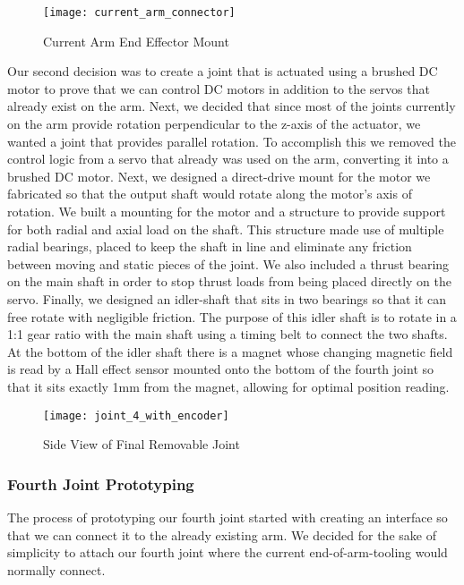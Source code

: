 \begin{figure}[H]
	\centering
	\texttt{[image: current\_arm\_connector]}
	\caption{Current Arm End Effector Mount}
	\label{Current Arm Encoder Mount}
\end{figure}



\noindent Our second decision was to create a joint that is actuated using a brushed DC motor to prove that we can control DC motors in addition to the servos that already exist on the arm.  Next, we decided that since most of the joints currently on the arm provide rotation perpendicular to the z-axis of the actuator, we wanted a joint that provides parallel rotation. To accomplish this we removed the control logic from a servo that already was used on the arm, converting it into a brushed DC motor. Next, we designed a direct-drive mount for the motor we fabricated so that the output shaft would rotate along the motor's axis of rotation.  We built a mounting for the motor and a structure to provide support for both radial and axial load on the shaft. This structure made use of multiple radial bearings, placed to keep the shaft in line and eliminate any friction between moving and static pieces of the joint.  We also included a thrust bearing on the main shaft in order to stop thrust loads from being placed directly on the servo.  Finally, we designed an idler-shaft that sits in two bearings so that it can free rotate with negligible friction. The purpose of this idler shaft is to rotate in a 1:1 gear ratio with the main shaft using a timing belt to connect the two shafts.  At the bottom of the idler shaft there is a magnet whose changing magnetic field is read by a Hall effect sensor mounted onto the bottom of the fourth joint so that it sits exactly 1mm from the magnet, allowing for optimal position reading.  \\

\begin{figure}[H]
	\centering
	\texttt{[image: joint\_4\_with\_encoder]}
	\caption{Side View of Final Removable Joint}
	\label{fig:Side View of Joint 4}
\end{figure}

\subsubsection{Fourth Joint Prototyping}
The process of prototyping our fourth joint started with creating an interface so that we can connect it to the already existing arm.  We decided for the sake of simplicity to attach our fourth joint where the current end-of-arm-tooling would normally connect. %


